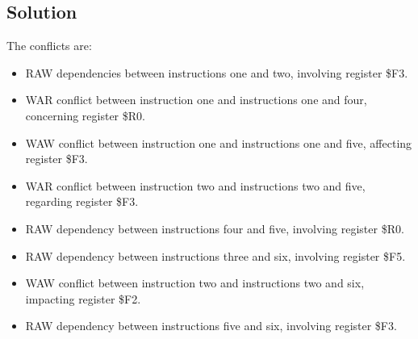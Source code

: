 \subsection*{Solution}
The conflicts are: 
\begin{itemize}
    \item RAW dependencies between instructions one and two, involving register \$F3.
    \item WAR conflict between instruction one and instructions one and four, concerning register \$R0.
    \item WAW conflict between instruction one and instructions one and five, affecting register \$F3.
    \item WAR conflict between instruction two and instructions two and five, regarding register \$F3.
    \item RAW dependency between instructions four and five, involving register \$R0.
    \item RAW dependency between instructions three and six, involving register \$F5.
    \item WAW conflict between instruction two and instructions two and six, impacting register \$F2.
    \item RAW dependency between instructions five and six, involving register \$F3.
\end{itemize}

